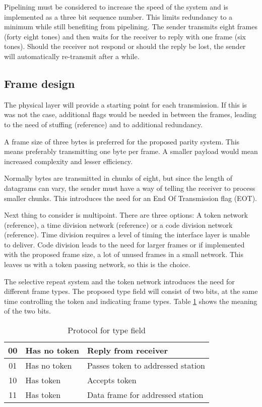 Pipelining must be considered to increase the speed of the system and is
implemented as a three bit sequence number. This limits redundancy to a minimum
while still benefiting from pipelining. The sender transmits eight frames
(forty eight tones) and then waits for the receiver to reply with one frame
(six tones). Should the receiver not respond or should the reply be lost, the
sender will automatically re-transmit after a while.

\subsection{Frame design}\label{dll_frame_design}
The physical layer will provide a starting point for each
transmission. If this is was not the case,
additional flags would be needed in between the frames, leading to the
need of stuffing (reference) and to additional redundancy.

A frame size of three bytes is preferred for the proposed parity system. This
means preferably transmitting one byte per frame. A smaller payload would mean
increased complexity and lesser efficiency.

Normally bytes are transmitted in chunks of eight, but since the length of
datagrams can vary, the sender must have a way of telling the receiver to process smaller
chunks. This introduces the need for an End Of Transmission flag (EOT).

Next thing to consider is multipoint. There are three options: A token
network (reference), a time division network (reference) or a code division
network (reference). Time division requires a level of timing the interface layer
is unable to deliver. Code division leads to the need for larger frames or if implemented with the
proposed frame size, a lot of unused frames in a small network. This leaves us
with a token passing network, so this is the choice.

The selective repeat system and the token network introduces the need for
different frame types. The proposed type field will consist of two bits, at the
same time controlling the token and indicating frame types. Table
\ref{tab:protocol_for_type_field} shows the meaning of the two bits.

\begin{table}[htb]
	\centering
	\begin{tabular}{|c|ll|}
		\hline
		00 & Has no token & Reply from receiver \\
		\hline
		01 & Has no token & Passes token to addressed station \\
		\hline
		10 & Has token & Accepts token \\
		\hline
		11 & Has token & Data frame for addressed station \\
		\hline
	\end{tabular}
	\caption{Protocol for type field}
	\label{tab:protocol_for_type_field}
\end{table}

